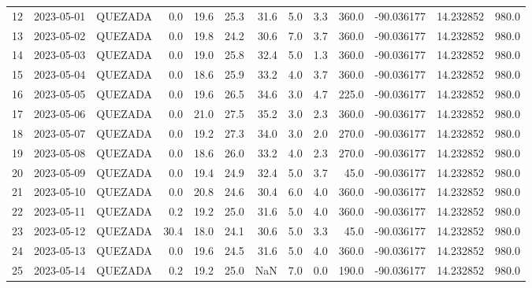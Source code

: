 \documentclass[12pt]{article}
\begin{document}
\begin{center}
\begin{tabular}{lllrrrrrrrrrr}
12  & 2023-05-01 &  QUEZADA &     0.0 &  19.6 &   25.3 &  31.6 &  5.0 &         3.3 &       360.0 & -90.036177 &  14.232852 &    980.0 \\
13  & 2023-05-02 &  QUEZADA &     0.0 &  19.8 &   24.2 &  30.6 &  7.0 &         3.7 &       360.0 & -90.036177 &  14.232852 &    980.0 \\
14  & 2023-05-03 &  QUEZADA &     0.0 &  19.0 &   25.8 &  32.4 &  5.0 &         1.3 &       360.0 & -90.036177 &  14.232852 &    980.0 \\
15  & 2023-05-04 &  QUEZADA &     0.0 &  18.6 &   25.9 &  33.2 &  4.0 &         3.7 &       360.0 & -90.036177 &  14.232852 &    980.0 \\
16  & 2023-05-05 &  QUEZADA &     0.0 &  19.6 &   26.5 &  34.6 &  3.0 &         4.7 &       225.0 & -90.036177 &  14.232852 &    980.0 \\
17  & 2023-05-06 &  QUEZADA &     0.0 &  21.0 &   27.5 &  35.2 &  3.0 &         2.3 &       360.0 & -90.036177 &  14.232852 &    980.0 \\
18  & 2023-05-07 &  QUEZADA &     0.0 &  19.2 &   27.3 &  34.0 &  3.0 &         2.0 &       270.0 & -90.036177 &  14.232852 &    980.0 \\
19  & 2023-05-08 &  QUEZADA &     0.0 &  18.6 &   26.0 &  33.2 &  4.0 &         2.3 &       270.0 & -90.036177 &  14.232852 &    980.0 \\
20  & 2023-05-09 &  QUEZADA &     0.0 &  19.4 &   24.9 &  32.4 &  5.0 &         3.7 &        45.0 & -90.036177 &  14.232852 &    980.0 \\
21  & 2023-05-10 &  QUEZADA &     0.0 &  20.8 &   24.6 &  30.4 &  6.0 &         4.0 &       360.0 & -90.036177 &  14.232852 &    980.0 \\
22  & 2023-05-11 &  QUEZADA &     0.2 &  19.2 &   25.0 &  31.6 &  5.0 &         4.0 &       360.0 & -90.036177 &  14.232852 &    980.0 \\
23  & 2023-05-12 &  QUEZADA &    30.4 &  18.0 &   24.1 &  30.6 &  5.0 &         3.3 &        45.0 & -90.036177 &  14.232852 &    980.0 \\
24  & 2023-05-13 &  QUEZADA &     0.0 &  19.6 &   24.5 &  31.6 &  5.0 &         4.0 &       360.0 & -90.036177 &  14.232852 &    980.0 \\
25  & 2023-05-14 &  QUEZADA &     0.2 &  19.2 &   25.0 &   NaN &  7.0 &         0.0 &       190.0 & -90.036177 &  14.232852 &    980.0 \\
\bottomrule
\end{tabular}

        
        \end{center}
        
\end{document}
